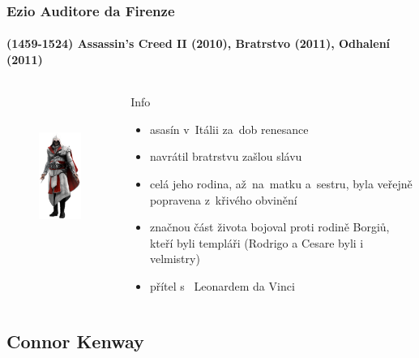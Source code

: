\documentclass[hyperref={colorlinks, linkcolor=white, urlcolor=green!50!black}]{beamer}
\begin{document}
\begin{frame}\label{ezio}
\frametitle{Ezio Auditore da Firenze}
\framesubtitle{(1459-1524) \hfill Assassin's Creed II (2010), Bratrstvo (2011), Odhalení (2011)}
\begin{columns}[c]

	\begin{figure}[h]
		\centering
		\includegraphics[height=200px]{char_ezio}
	\end{figure}
	
	\begin{block}{Info}
	\begin{itemize}
		\item asasín v~Itálii za~dob renesance
		\item navrátil bratrstvu zašlou slávu
		\item celá jeho rodina, až~na~matku a~sestru, byla veřejně popravena z~křivého obvinění
		\item značnou část života bojoval proti rodině Borgiů, kteří byli templáři (Rodrigo a Cesare byli i velmistry)
		\item přítel s~{\color{darkred} Leonardem da Vinci}
	\end{itemize}
	\end{block}
	
\end{columns}
\end{frame}

\subsection[Connor]{Connor Kenway}
\end{document}
